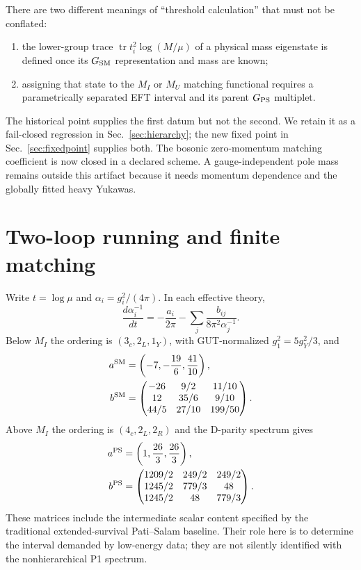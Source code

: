 \documentclass[11pt]{article}
\newcommand{\tr}{\operatorname{tr}}
\newcommand{\PS}{G_{\rm PS}}
\newcommand{\SM}{G_{\rm SM}}
\begin{document}
There are two different meanings of ``threshold calculation'' that must not
be conflated:
\begin{enumerate}
\item the lower-group trace $\tr t_i^2\log(M/\mu)$ of a physical mass
  eigenstate is defined once its $\SM$ representation and mass are known;
\item assigning that state to the $M_I$ or $M_U$ matching functional requires
  a parametrically separated EFT interval and its parent $\PS$ multiplet.
\end{enumerate}
The historical point supplies the first datum but not the second.  We retain
it as a fail-closed regression in Sec.~\ref{sec:hierarchy}; the new fixed
point in Sec.~\ref{sec:fixedpoint} supplies both.  The bosonic zero-momentum
matching coefficient is now closed in a declared scheme.  A
gauge-independent pole mass remains outside this artifact because it needs
momentum dependence and the globally fitted heavy Yukawas.

\section{Two-loop running and finite matching}

Write $t=\log\mu$ and $\alpha_i=g_i^2/(4\pi)$.  In each effective theory,
\begin{equation}
 \frac{d\alpha_i^{-1}}{dt}
 =-\frac{a_i}{2\pi}
  -\sum_j\frac{b_{ij}}{8\pi^2\alpha_j^{-1}}.
 \label{eq:rge}
\end{equation}
Below $M_I$ the ordering is $(3_c,2_L,1_Y)$, with GUT-normalized
$g_1^2=5g_Y^2/3$, and
\begin{align}
 a^{\rm SM}&=\left(-7,-\frac{19}{6},\frac{41}{10}\right),\nonumber\\
 b^{\rm SM}&=
 \begin{pmatrix}
 -26&9/2&11/10\\
 12&35/6&9/10\\
 44/5&27/10&199/50
 \end{pmatrix}.
 \label{eq:smcoeff}
\end{align}
Above $M_I$ the ordering is $(4_c,2_L,2_R)$ and the D-parity spectrum gives
\begin{align}
 a^{\rm PS}&=\left(1,\frac{26}{3},\frac{26}{3}\right),\nonumber\\
 b^{\rm PS}&=
 \begin{pmatrix}
 1209/2&249/2&249/2\\
 1245/2&779/3&48\\
 1245/2&48&779/3
 \end{pmatrix}.
 \label{eq:pscoeff}
\end{align}
These matrices include the intermediate scalar content specified by the
traditional extended-survival Pati--Salam baseline.  Their role here is to
determine the interval demanded by low-energy data; they are not silently
identified with the nonhierarchical P1 spectrum.
\end{document}
